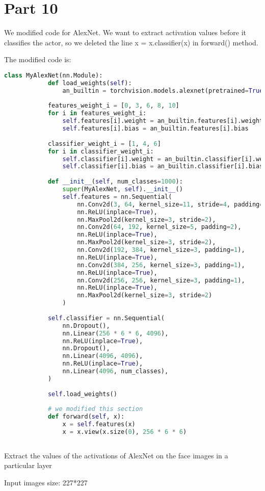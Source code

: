 \documentclass{article}
\newcommand{\enterProblemHeader}[1]{
}
\newcommand{\exitProblemHeader}[1]{
}
\newcounter{homeworkProblemCounter} %
\newcommand{\homeworkProblemName}{}
\newenvironment{homeworkProblem}[1][Problem \arabic{homeworkProblemCounter}]{ %
	\stepcounter{homeworkProblemCounter} %
	\renewcommand{\homeworkProblemName}{#1} %
	\section{\homeworkProblemName} %
	\enterProblemHeader{\homeworkProblemName} %
}{
	\exitProblemHeader{\homeworkProblemName} %
}
\begin{document}
		\begin{homeworkProblem}[Part 10]
			
		We modified code for AlexNet.  We want to extract activation values before it classifies the actor, so we deleted the line x = x.classifier(x) in forward() method. 
		
		The modified code is:
		
		\begin{lstlisting}[language=Python, caption=modified code for AlexNet]
		class MyAlexNet(nn.Module):
			def load_weights(self):
				an_builtin = torchvision.models.alexnet(pretrained=True)
			
			features_weight_i = [0, 3, 6, 8, 10]
			for i in features_weight_i:
				self.features[i].weight = an_builtin.features[i].weight
				self.features[i].bias = an_builtin.features[i].bias
			
			classifier_weight_i = [1, 4, 6]
			for i in classifier_weight_i:
				self.classifier[i].weight = an_builtin.classifier[i].weight
				self.classifier[i].bias = an_builtin.classifier[i].bias
			
			def __init__(self, num_classes=1000):
				super(MyAlexNet, self).__init__()
				self.features = nn.Sequential(
					nn.Conv2d(3, 64, kernel_size=11, stride=4, padding=2),
					nn.ReLU(inplace=True),
					nn.MaxPool2d(kernel_size=3, stride=2),
					nn.Conv2d(64, 192, kernel_size=5, padding=2),
					nn.ReLU(inplace=True),
					nn.MaxPool2d(kernel_size=3, stride=2),
					nn.Conv2d(192, 384, kernel_size=3, padding=1),
					nn.ReLU(inplace=True),
					nn.Conv2d(384, 256, kernel_size=3, padding=1),
					nn.ReLU(inplace=True),
					nn.Conv2d(256, 256, kernel_size=3, padding=1),
					nn.ReLU(inplace=True),
					nn.MaxPool2d(kernel_size=3, stride=2)
				)
			
			self.classifier = nn.Sequential(
				nn.Dropout(),
				nn.Linear(256 * 6 * 6, 4096),
				nn.ReLU(inplace=True),
				nn.Dropout(),
				nn.Linear(4096, 4096),
				nn.ReLU(inplace=True),
				nn.Linear(4096, num_classes),
			)
			
			self.load_weights()
			
			# we modified this section
			def forward(self, x):
				x = self.features(x)
				x = x.view(x.size(0), 256 * 6 * 6)
		
		\end{lstlisting}
		
		Extract the values of the activations of AlexNet on the face images in a particular layer
		
		Input images size: 227*227
		

\end{homeworkProblem}
\end{document}
